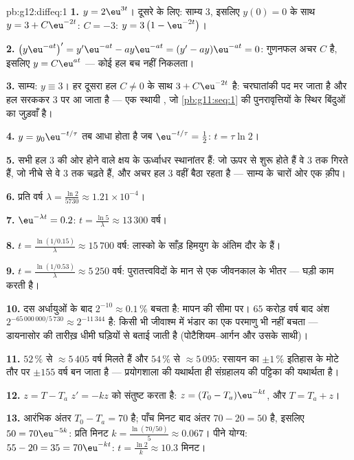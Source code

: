 \begin{solution}{pb:g12:diffeq:1}
\textbf{1.} $y = 2\eu^{3t}$। दूसरे के लिए: साम्य $3$, इसलिए $y(0) = 0$ के साथ $y = 3 + C\eu^{-2t}$: $C = -3$:
$y = 3\left(1 - \eu^{-2t}\right)$।

\textbf{2.} $\left(y\eu^{-at}\right)' = y'\eu^{-at} -
ay\eu^{-at} = (y' - ay)\eu^{-at} = 0$: गुणनफल अचर $C$ है, इसलिए $y = C\eu^{at}$ --- कोई हल बच नहीं
निकलता।

\textbf{3.} साम्य: $y \equiv 3$। हर दूसरा हल $C \neq 0$ के साथ $3 + C\eu^{-2t}$ है: चरघातांकी पद मर
जाता है और हल सरककर $3$ पर आ जाता है --- एक स्थायी , जो \cref{pb:g11:seq:1} की
पुनरावृत्तियों के स्थिर बिंदुओं का  जुड़वाँ है।

\textbf{4.} $y = y_0\eu^{-t/\tau}$ तब आधा होता है जब $\eu^{-t/\tau} = \frac12$: $t = \tau\ln 2$।

\textbf{5.} सभी हल $3$ की ओर होने वाले क्षय के ऊर्ध्वाधर स्थानांतर हैं: जो
ऊपर से शुरू होते हैं वे $3$ तक गिरते हैं, जो नीचे से वे $3$ तक चढ़ते हैं,
और अचर हल $3$ वहीं बैठा रहता है --- साम्य के चारों ओर एक क़ीप।

\textbf{6.} प्रति वर्ष $\lambda = \frac{\ln 2}{5730} \approx 1.21 \times
10^{-4}$।

\textbf{7.} $\eu^{-\lambda t} = 0.2$: $t = \frac{\ln 5}{\lambda} \approx 13\,300$ वर्ष।

\textbf{8.} $t = \frac{\ln(1/0.15)}{\lambda} \approx 15\,700$ वर्ष: लास्को के साँड़ हिमयुग के अंतिम दौर के हैं।

\textbf{9.} $t = \frac{\ln(1/0.53)}{\lambda} \approx 5\,250$ वर्ष: पुरातत्त्वविदों के मान से एक जीवनकाल के भीतर ---
घड़ी काम करती है।

\textbf{10.} दस अर्धायुओं के बाद $2^{-10} \approx 0.1\,\%$ बचता है: मापन की सीमा पर। $65$ करोड़
वर्ष बाद अंश $2^{-65\,000\,000/5\,730} \approx 2^{-11\,344}$ है: किसी भी जीवाश्म में  भंडार का एक परमाणु भी नहीं
बचता --- डायनासोर की तारीख़ धीमी घड़ियों से बताई जाती है (पोटैशियम--आर्गन और
उसके साथी)।

\textbf{11.} $52\,\%$ से $\approx 5\,405$ वर्ष मिलते हैं और $54\,\%$ से $\approx 5\,095$: रसायन का $\pm 1\,\%$
इतिहास के मोटे तौर पर $\pm 155$ वर्ष बन जाता है --- प्रयोगशाला की यथार्थता ही
संग्रहालय की पट्टिका की यथार्थता है।

\textbf{12.} $z = T - T_a$ $z' = -kz$ को संतुष्ट करता है: $z = (T_0 - T_a)\eu^{-kt}$, और $T = T_a + z$।

\textbf{13.} आरंभिक अंतर $T_0 - T_a = 70$ है; पाँच मिनट बाद अंतर $70 - 20 = 50$ है, इसलिए $50 = 70\eu^{-5k}$:
प्रति मिनट $k = \frac{\ln(70/50)}{5} \approx 0.067$। पीने योग्य: $55 - 20 = 35 = 70\eu^{-kt}$: $t = \frac{\ln 2}{k} \approx 10.3$ मिनट।


\end{solution}
